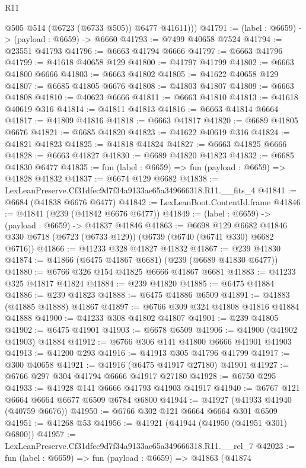 \begin{lexlean}{R11}
\begin{coremodule}
          @505
          @514
          (@6723 (@6733 @505))
          @6477
          @41611)))
@41791 := (label : @6659) -> (payload : @6659) -> @6660
@41793 := @7499 @40658 @7524
@41794 := @23551 @41793
@41796 := @6663 @41794 @6666
@41797 := @6663 @41796
@41799 := @41618 @40658 @129
@41800 := @41797 @41799
@41802 := @6663 @41800 @6666
@41803 := @6663 @41802
@41805 := @41622 @40658 @129
@41807 := @6685 @41805 @6676
@41808 := @41803 @41807
@41809 := @6663 @41808
@41810 := @40623 @6666
@41811 := @6663 @41810
@41813 := @41618 @40619 @316
@41814 := @41811 @41813
@41816 := @6663 @41814 @6664
@41817 := @41809 @41816
@41818 := @6663 @41817
@41820 := @6689 @41805 @6676
@41821 := @6685 @41820
@41823 := @41622 @40619 @316
@41824 := @41821 @41823
@41825 := @41818 @41824
@41827 := @6663 @41825 @6666
@41828 := @6663 @41827
@41830 := @6689 @41820 @41823
@41832 := @6685 @41830 @6477
@41835 := fun (label : @6659) => fun (payload : @6659) => @41828 @41832
@41837 := @6674 @129 @6682
@41838 := LexLeanPreserve.Cf31dfec9d7f34a9133ae65a349666318.R11.__fits_4
@41841 := @6684 (@41838 @6676 @6477)
@41842 := LexLeanBoot.ContentId.frame
@41846 := @41841 (@239 (@41842 @6676 @6477))
@41849 := (label : @6659) -> (payload : @6659) -> @41837 @41846
@41863 := @6698
    @129
    @6682
    @41846
    @330
    @6718
    (@6723 (@6733 @129))
    (@6739 (@6740 (@6741 @330) @6682 @6716))
@41866 := @41233 @328 @41827 @41832
@41867 := @239 @41830
@41874 := @41866 (@6475 @41867 @6681) (@239 (@6689 @41830 @6477))
@41880 := @6766 @326 @154 @41825 @6666 @41867 @6681
@41883 := @41233 @325 @41817 @41824
@41884 := @239 @41820
@41885 := @6475 @41884
@41886 := @239 @41823
@41888 := @6475 @41886 @6509
@41891 := @41883 (@41885 @41888) @41867
@41897 := @6766 @309 @324 @41808 @41816 @41884 @41888
@41900 := @41233 @308 @41802 @41807
@41901 := @239 @41805
@41902 := @6475 @41901
@41903 := @6678 @6509
@41906 := @41900 (@41902 @41903) @41884
@41912 := @6766 @306 @141 @41800 @6666 @41901 @41903
@41913 := @41200 @293
@41916 := @41913 @305 @41796 @41799
@41917 := @300 @40658
@41921 := @41916 (@6475 @41917 @27180) @41901
@41927 := @6766 @297 @304 @41794 @6666 @41917 @27180
@41928 := @6750 @295
@41933 := @41928 @141 @6666 @41793 @41903 @41917
@41940 := @6767 @121 @6664 @6664 @6677 @6509 @6784 @6800
@41944 := @41927 (@41933 @41940 (@40759 @6676))
@41950 := @6766 @302 @121 @6664 @6664 @301 @6509
@41951 := @41268 @53
@41956 := @41921 (@41944 (@41950 (@41951 @301) @6800))
@41957 := LexLeanPreserve.Cf31dfec9d7f34a9133ae65a349666318.R11.__rel_7
@42023 := fun (label : @6659) =>
  fun (payload : @6659) =>
  @41863
    (@41874

\end{coremodule}
\end{lexlean}
